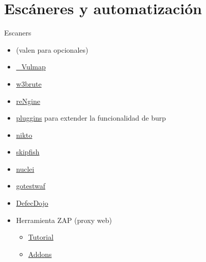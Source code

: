\documentclass[aspectratio=169,10pt]{beamer}
\begin{document}
\section{Escáneres y automatización}

\begin{frame}[allowframebreaks]{Escaners}
\small
  \begin{itemize}
  \item (valen para opcionales)
  \item \href{https://en.iguru.gr/2020/12/26/vulmap-sarosi-gia-web-efpatheies/}{\_Vulmap}
  \item \href{https://github.com/mlynchcogent/w3brute}{w3brute}
  \item \href{https://hackpuntes.com/rengine-framework-de-reconocimiento-automatizado-para-aplicaciones-web/}{reNgine}
  \item \href{https://github.com/alphaSeclab/awesome-burp-suite/blob/master/Readme_en.md}{pluggins} para extender la funcionalidad de burp
  \item \href{https://ciberseguridad.com/herramientas/software/nikto/}{nikto}
  \item \href{https://hacking-etico.com/2016/04/28/skipfish-escaner/}{skipfish}
  \item \href{https://github.com/projectdiscovery/nuclei}{nuclei}
  \item \href{https://github.com/wallarm/gotestwaf}{gotestwaf}
  \item \href{https://github.com/DefectDojo/django-DefectDojo}{DefecDojo}
  \item Herramienta ZAP (proxy web)
    \begin{itemize}
    \item \href{https://snifer.gitbooks.io/owasp-zed-attack-proxy-guide/content/}{Tutorial}
    \item \href{https://www.zaproxy.org/addons/}{Addons}
    \end{itemize}
  \end{itemize}
\end{frame}
\end{document}

